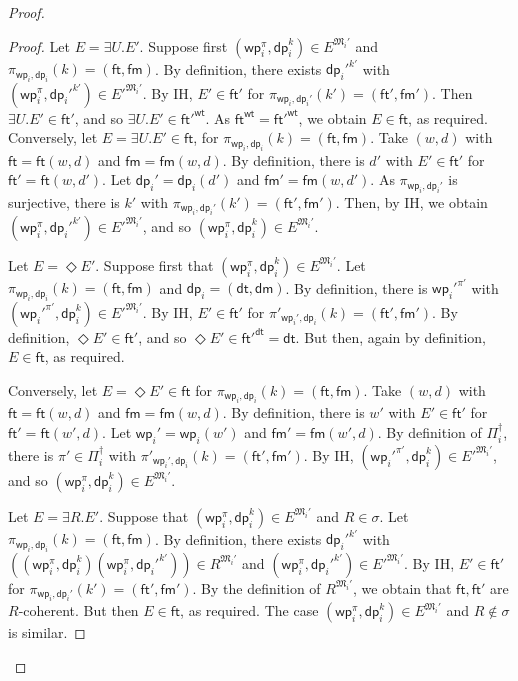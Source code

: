 \documentclass[10pt,a4paper]{amsart}
\theoremstyle{plain}
\theoremstyle{definition}
\newcommand{\wt}{\mathsf{wt}}
\newcommand{\dt}{\mathsf{dt}}
\newcommand{\ft}{\mathsf{ft}}
\newcommand{\dm}{\mathsf{dm}}
\newcommand{\iwp}{\mathsf{wp}_i}
\newcommand{\idp}{\mathsf{dp}_i}
\newcommand{\pet}{\ft}
\newcommand{\pam}{\mathsf{fm}}
\begin{document}
\begin{proof}
\begin{proof}
Let $E = \exists U.E'$. Suppose first $(\iwp^{\pi},\idp^{k}) \in E^{\mathfrak{M}_{i}'}$ and $\pi_{\iwp,\idp}(k)= (\pet, \pam)$.
By definition, there exists ${\idp'}^{k'}$ with  
$(\iwp^{\pi},{\idp'}^{k'}) \in E'^{\mathfrak{M}_{i}'}$. By IH,
$E'\in \pet'$ for $\pi_{\iwp,\idp'}(k')=
(\pet',\pam')$. Then $\exists U.E'\in \pet'$, and so $\exists U.E'\in {\pet'}^{\wt}$. As $\pet^{\wt}={\pet'}^{\wt}$, we obtain $E\in \pet$, as required.
%
Conversely, let $E = \exists U.E' \in \pet$, for $\pi_{\iwp,\idp}(k)=
(\pet, \pam)$. Take $(w,d)$ with $\pet=\pet(w,d)$ and $\pam=\pam(w,d)$. By definition, there is $d'$ with $E'\in \pet'$ for
$\pet'=\pet(w,d')$. Let $\idp'=\idp(d')$ and $\pam'=\pam(w,d')$. As $\pi_{\iwp,\idp'}$ is surjective, there is
$k'$ with $\pi_{\iwp,\idp'}(k')=(\pet',\pam')$.
Then, by IH, we obtain $(\iwp^\pi, \idp'^{k'}) \in E'^{\mathfrak{M}_{i}'}$, and so $(\iwp^\pi, \idp^k) \in E^{\mathfrak{M}_{i}'}$.

Let $E = \Diamond E'$. Suppose first that $(\iwp^\pi, \idp^k) \in E^{\mathfrak{M}_{i}'}$. Let $\pi_{\iwp,\idp}(k)= (\pet, \pam)$ and $\idp = (\dt,\dm)$. By definition, there is $\iwp'^{\pi'}$ with
$(\iwp'^{\pi'},\idp^k) \in E'^{\mathfrak{M}_{i}'}$. By IH,
$E'\in \pet'$ for $\pi'_{\iwp',\idp}(k)=
(\pet',\pam')$. By definition, $\Diamond E'\in \pet'$, and so
$\Diamond E'\in {\pet'}^{\dt}=\dt$. But then, again by definition, $E\in \pet$,
as required.

Conversely, let $E = \Diamond E' \in \pet$ for $\pi_{\iwp,\idp}(k)=
(\pet,\pam)$. Take $(w,d)$ with $\pet=\pet(w,d)$ and $\pam=\pam(w,d)$. By definition, there is $w'$ with $E'\in \pet'$ for
$\pet'=\pet(w',d)$. Let $\iwp'=\iwp(w')$ and $\pam'=\pam(w',d)$. By definition of $\Pi_{i}^{\dag}$, there is $\pi'\in \Pi_{i}^{\dag}$ with $\pi'_{\iwp',\idp}(k) =(\pet',\pam')$. By IH, $(\iwp'^{\pi'},\idp^k) \in E'^{\mathfrak{M}_{i}'}$, and so $(\iwp^\pi,\idp^k) \in E^{\mathfrak{M}_{i}'}$.

Let $E = \exists R.E'$. Suppose that $(\iwp^\pi,\idp^k) \in E^{\mathfrak{M}_{i}'}$ and $R\in \sigma$. Let $\pi_{\iwp,\idp}(k)= (\pet, \pam)$. By definition, there exists $\idp'^{k'}$ with
%
$((\iwp^\pi,\idp^k)(\iwp^\pi,\idp'^{k'})) \in R^{\mathfrak{M}_{i}'}$
%
and $(\iwp^\pi,\idp'^{k'}) \in E'^{\mathfrak{M}_{i}'}$. By IH,
$E'\in \pet'$ for $\pi_{\iwp,\idp'}(k')=
(\pet',\pam')$. By the definition of $R^{\mathfrak{M}_{i}'}$, we obtain that $\pet,\pet'$ are $R$-coherent. But then $E\in \pet$, as required.
%
The case $(\iwp^\pi,\idp^k) \in E^{\mathfrak{M}_{i}'}$ and $R\not\in \sigma$ is similar.


\end{proof}
\end{proof}
\end{document}
